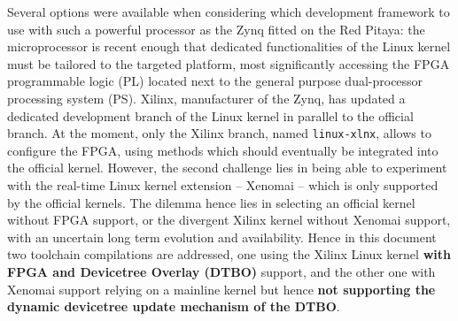 \documentclass{article}
\begin{document}
Several options were available when considering which development framework to use with
such a powerful processor as the Zynq fitted on the Red Pitaya: the microprocessor is recent
enough that dedicated functionalities of the Linux kernel must be tailored to the targeted
platform, most significantly accessing the FPGA programmable logic (PL) located next to the 
general purpose dual-processor processing system (PS). Xilinx, manufacturer of the Zynq, has
updated a dedicated development branch of the Linux kernel in parallel to the official branch.
At the moment, only the Xilinx branch, named {\tt linux-xlnx}, allows to configure the FPGA, 
using methods which should eventually be integrated into the official kernel. However, the 
second challenge lies in being able to experiment with the real-time Linux kernel extension -- 
Xenomai -- which is only supported by the official kernels. The dilemma hence lies in selecting
an official kernel without FPGA support, or the divergent Xilinx kernel without Xenomai support, 
with an uncertain long term evolution and availability. Hence in this document two toolchain 
compilations are addressed, one using the Xilinx Linux kernel {\bf with FPGA and Devicetree Overlay
(DTBO)} support, and the other one with Xenomai support relying on a mainline kernel but hence
{\bf not supporting the dynamic devicetree update mechanism of the DTBO}.
\end{document}
